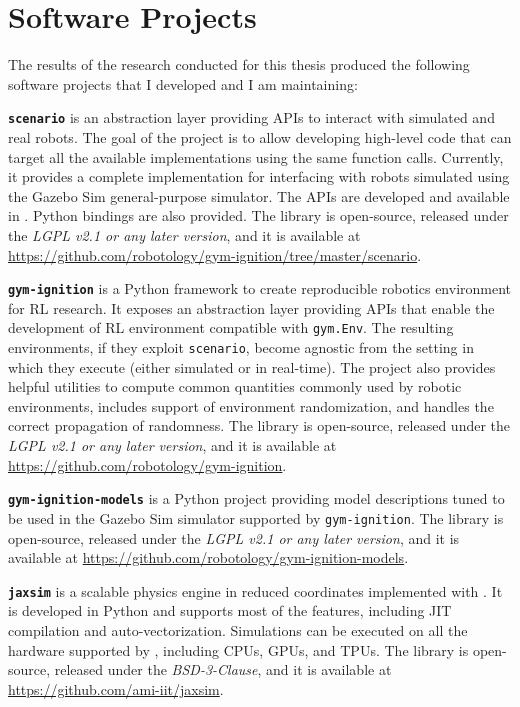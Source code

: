 \newpage
\section*{Software Projects}

The results of the research conducted for this thesis produced the following software projects that I developed and I am maintaining:

\vspace{3mm}
\noindent
\textbf{\texttt{scenario}} is an abstraction layer providing \acsp{API} to interact with simulated and real robots. The goal of the project is to allow developing high-level code that can target all the available implementations using the same function calls. Currently, it provides a complete implementation for interfacing with robots simulated using the Gazebo Sim general-purpose simulator. The \acsp{API} are developed and available in \cpp. Python bindings are also provided. The library is open-source, released under the \emph{LGPL v2.1 or any later version}, and it is available at \linebreak \url{https://github.com/robotology/gym-ignition/tree/master/scenario}.

\vspace{3mm}
\noindent
\textbf{\texttt{gym-ignition}} is a Python framework to create reproducible robotics environment for \acs{RL} research. It exposes an abstraction layer providing \acsp{API} that enable the development of \acs{RL} environment compatible with \texttt{gym.Env}. The resulting environments, if they exploit \texttt{scenario},  become agnostic from the setting in which they execute (either simulated or in real-time). The project also provides helpful utilities to compute common quantities commonly used by robotic environments, includes support of environment randomization, and handles the correct propagation of randomness. The library is open-source, released under the \emph{LGPL v2.1 or any later version}, and it is available at \linebreak \url{https://github.com/robotology/gym-ignition}.

\vspace{3mm}
\noindent
\textbf{\texttt{gym-ignition-models}} is a Python project providing model descriptions tuned to be used in the Gazebo Sim simulator supported by \texttt{gym-ignition}. The library is open-source, released under the \emph{LGPL v2.1 or any later version}, and it is available at \url{https://github.com/robotology/gym-ignition-models}.

\vspace{3mm}
\noindent
\textbf{\texttt{jaxsim}} is a scalable physics engine in reduced coordinates implemented with \jax. It is developed in Python and supports most of the \jax features, including \acs{JIT} compilation and auto-vectorization. Simulations can be executed on all the hardware supported by \jax, including \acsp{CPU}, \acsp{GPU}, and \acsp{TPU}. The library is open-source, released under the \emph{BSD-3-Clause}, and it is available at \linebreak \url{https://github.com/ami-iit/jaxsim}.
